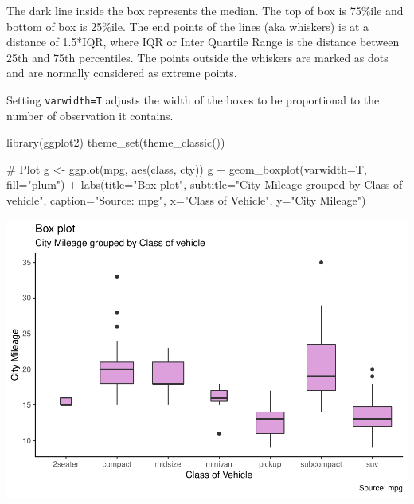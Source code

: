 \documentclass[a4paper]{article}
\newenvironment{Shaded}{}{}
\newcommand{\KeywordTok}[1]{\textcolor[rgb]{0.00,0.00,1.00}{#1}}
\newcommand{\DataTypeTok}[1]{#1}
\newcommand{\StringTok}[1]{\textcolor[rgb]{0.00,0.50,0.50}{#1}}
\newcommand{\CommentTok}[1]{\textcolor[rgb]{0.00,0.50,0.00}{#1}}
\newcommand{\OperatorTok}[1]{#1}
\newcommand{\NormalTok}[1]{#1}
\begin{document}
The dark line inside the box represents the median. The top of box is
75\%ile and bottom of box is 25\%ile. The end points of the lines (aka
whiskers) is at a distance of 1.5*IQR, where IQR or Inter Quartile Range
is the distance between 25th and 75th percentiles. The points outside
the whiskers are marked as dots and are normally considered as extreme
points.

Setting \texttt{varwidth=T} adjusts the width of the boxes to be
proportional to the number of observation it contains.

\begin{Shaded}
\begin{Highlighting}[]
\KeywordTok{library}\NormalTok{(ggplot2)}
\KeywordTok{theme_set}\NormalTok{(}\KeywordTok{theme_classic}\NormalTok{())}

\CommentTok{# Plot}
\NormalTok{g <-}\StringTok{ }\KeywordTok{ggplot}\NormalTok{(mpg, }\KeywordTok{aes}\NormalTok{(class, cty))}
\NormalTok{g }\OperatorTok{+}\StringTok{ }\KeywordTok{geom_boxplot}\NormalTok{(}\DataTypeTok{varwidth=}\NormalTok{T, }\DataTypeTok{fill=}\StringTok{"plum"}\NormalTok{) }\OperatorTok{+}\StringTok{ }
\StringTok{    }\KeywordTok{labs}\NormalTok{(}\DataTypeTok{title=}\StringTok{"Box plot"}\NormalTok{, }
         \DataTypeTok{subtitle=}\StringTok{"City Mileage grouped by Class of vehicle"}\NormalTok{,}
         \DataTypeTok{caption=}\StringTok{"Source: mpg"}\NormalTok{,}
         \DataTypeTok{x=}\StringTok{"Class of Vehicle"}\NormalTok{,}
         \DataTypeTok{y=}\StringTok{"City Mileage"}\NormalTok{)}
\end{Highlighting}
\end{Shaded}

\includegraphics{M24-ggplot2_Gallery_files/figure-latex/unnamed-chunk-26-1.pdf}
\end{document}
